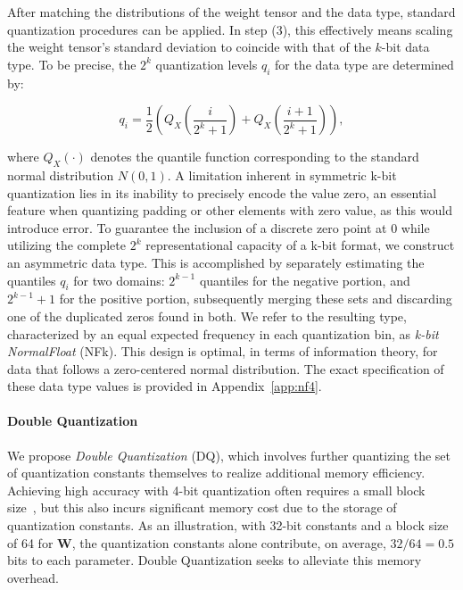 After matching the distributions of the weight tensor and the data type, standard quantization procedures can be applied. In step (3), this effectively means scaling the weight tensor's standard deviation to coincide with that of the $k$-bit data type. To be precise, the $2^k$ quantization levels $q_i$ for the data type are determined by:

\begin{equation}
q_i  = \frac{1}{2}\left( Q_X\left(\frac{i}{2^k+1}\right) + Q_X\left(\frac{i+1}{2^k+1}\right)\right),
\end{equation}

where $Q_X(\cdot)$ denotes the quantile function corresponding to the standard normal distribution $N(0,1)$. A limitation inherent in symmetric k-bit quantization lies in its inability to precisely encode the value zero, an essential feature when quantizing padding or other elements with zero value, as this would introduce error. To guarantee the inclusion of a discrete zero point at $0$ while utilizing the complete $2^k$ representational capacity of a k-bit format, we construct an asymmetric data type. This is accomplished by separately estimating the quantiles $q_i$ for two domains: $2^{k-1}$ quantiles for the negative portion, and $2^{k-1}+1$ for the positive portion, subsequently merging these sets and discarding one of the duplicated zeros found in both. We refer to the resulting type, characterized by an equal expected frequency in each quantization bin, as \emph{k-bit NormalFloat} (NFk). This design is optimal, in terms of information theory, for data that follows a zero-centered normal distribution. The exact specification of these data type values is provided in Appendix~\ref{app:nf4}.

\paragraph{Double Quantization{}} 
We propose \emph{Double Quantization} (DQ), which involves further quantizing the set of quantization constants themselves to realize additional memory efficiency. Achieving high accuracy with 4-bit quantization often requires a small block size~\citep{dettmers2022case}, but this also incurs significant memory cost due to the storage of quantization constants. As an illustration, with 32-bit constants and a block size of 64 for $\mathbf{W}$, the quantization constants alone contribute, on average, $32/64 = 0.5$ bits to each parameter. Double Quantization seeks to alleviate this memory overhead.

